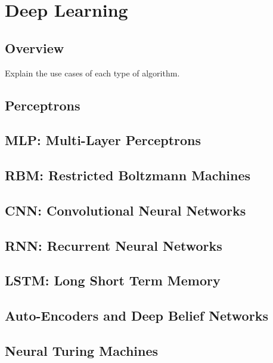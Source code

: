\section{Deep Learning}

\subsection{Overview}

Explain the use cases of each type of algorithm. 

\subsection{Perceptrons}

\subsection{MLP: Multi-Layer Perceptrons}

\subsection{RBM: Restricted Boltzmann Machines}

\subsection{CNN: Convolutional Neural Networks}

\subsection{RNN: Recurrent Neural Networks}

\subsection{LSTM: Long Short Term Memory}

\subsection{Auto-Encoders and Deep Belief Networks}

\subsection{Neural Turing Machines}
